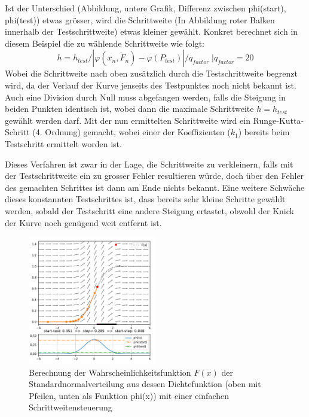 Ist der Unterschied (Abbildung, untere Grafik, Differenz zwischen phi(start), phi(test)) etwas grösser,
wird die Schrittweite (In Abbildung roter Balken innerhalb der Testschrittweite) etwas kleiner gewählt.
Konkret berechnet sich in diesem Beispiel die zu wählende Schrittweite wie folgt:
\[
  h=h_{test}/|\varphi(x_n, \tilde{F}_n)-\varphi(P_{test})|/q_{factor}\; |q_{factor}=20
\]
Wobei die Schrittweite nach oben zusätzlich durch die Testschrittweite begrenzt wird, da der Verlauf der Kurve jenseits des Testpunktes noch nicht bekannt ist.
Auch eine Division durch Null muss abgefangen werden, falls die Steigung in beiden Punkten identisch ist,
wobei dann die maximale Schrittweite $h=h_{test}$ gewählt werden darf.
Mit der nun ermittelten Schrittweite wird ein Runge-Kutta-Schritt (4. Ordnung) gemacht,
wobei einer der Koeffizienten ($k_1$) bereits beim Testschritt ermittelt worden ist.

Dieses Verfahren ist zwar in der Lage, die Schrittweite zu verkleinern, falls mit der Testschrittweite ein zu grosser Fehler resultieren würde,
doch über den Fehler des gemachten Schrittes ist dann am Ende nichts bekannt.
Eine weitere Schwäche dieses konstannten Testschrittes ist, dass bereits sehr kleine Schritte gewählt werden,
sobald der Testschritt eine andere Steigung ertastet, obwohl der Knick der Kurve noch genügend weit entfernt ist.

\begin{figure}
  \centering
  \includegraphics[width=0.5\textwidth]{papers/steps/img/ssc.pdf}
  \caption{Berechnung der Wahrscheinlichkeitsfunktion $F(x)$ der Standardnormalverteilung aus dessen Dichtefunktion
    (oben mit Pfeilen, unten als Funktion phi(x)) mit einer einfachen Schrittweitensteuerung
    \label{buch:steps:examplessc}}
\end{figure}

